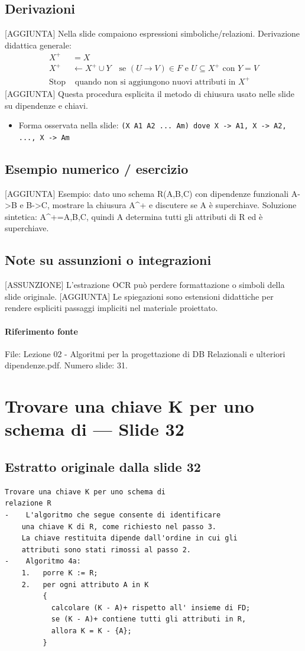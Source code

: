 \documentclass[11pt]{article}
\begin{document}
\subsection*{Derivazioni}
[AGGIUNTA] Nella slide compaiono espressioni simboliche/relazioni. Derivazione didattica generale:
\begin{align*}
X^+ &= X \\
X^+ &\leftarrow X^+ \cup Y \quad \text{se } (U \to V) \in F \text{ e } U \subseteq X^+ \text{ con } Y=V \\
\text{Stop} &\text{ quando non si aggiungono nuovi attributi in } X^+
\end{align*}
[AGGIUNTA] Questa procedura esplicita il metodo di chiusura usato nelle slide su dipendenze e chiavi.
\begin{itemize}[leftmargin=*]
\item Forma osservata nella slide: \texttt{(X   A1   A2   ...   Am) dove X -> A1, X -> A2, ..., X -> Am}
\end{itemize}
\subsection*{Esempio numerico / esercizio}
[AGGIUNTA] Esempio: dato uno schema R(A,B,C) con dipendenze funzionali A->B e B->C, mostrare la chiusura A^+ e discutere se A è superchiave. Soluzione sintetica: A^+={A,B,C}, quindi A determina tutti gli attributi di R ed è superchiave.
\subsection*{Note su assunzioni o integrazioni}
[ASSUNZIONE] L'estrazione OCR può perdere formattazione o simboli della slide originale.
[AGGIUNTA] Le spiegazioni sono estensioni didattiche per rendere espliciti passaggi impliciti nel materiale proiettato.
\paragraph{Riferimento fonte} File: Lezione 02 - Algoritmi per la progettazione di DB Relazionali e ulteriori dipendenze.pdf. Numero slide: 31.
\section{Trovare una chiave K per uno schema di --- Slide 32}
\subsection*{Estratto originale dalla slide 32}
\begin{lstlisting}
Trovare una chiave K per uno schema di
relazione R
-    L'algoritmo che segue consente di identificare
    una chiave K di R, come richiesto nel passo 3.
    La chiave restituita dipende dall'ordine in cui gli
    attributi sono stati rimossi al passo 2.
-    Algoritmo 4a:
    1.   porre K := R;
    2.   per ogni attributo A in K
         {
           calcolare (K - A)+ rispetto all' insieme di FD;
           se (K - A)+ contiene tutti gli attributi in R,
           allora K = K - {A};
         }
\end{lstlisting}
\end{document}
